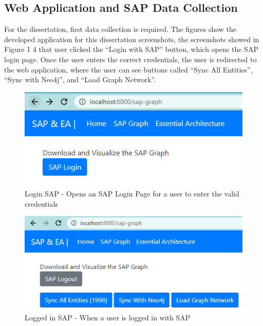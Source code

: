 \documentclass{article}
\begin{document}
\maketitle
\subsection{Web Application and SAP Data Collection}

For the dissertation, first data collection is required. The figures show the developed application for this dissertation screenshots, the screenshots showed in Figure 1 4  that user clicked the “Login with SAP” button, which opens the SAP login page. Once the user enters the correct credentials, the user is redirected to the web application, where the user can see buttons called “Sync All Entities”, “Sync with Neo4j”, and “Load Graph Network”.

\begin{figure}[ht!]
    \centering
    \includegraphics[scale=0.8]{sap-log-w}
    \caption{Login SAP - 
Opens an SAP Login Page for a user to enter the valid credentials
}
    \label{fig:sap-login}
\end{figure}

\begin{figure}[ht!]
    \centering
    \includegraphics[scale=0.8]{sap-logged-w}
    \caption{Logged in SAP - When a user is logged in with SAP
}
    \label{fig:sap-logged-in}
\end{figure}
\end{document}
